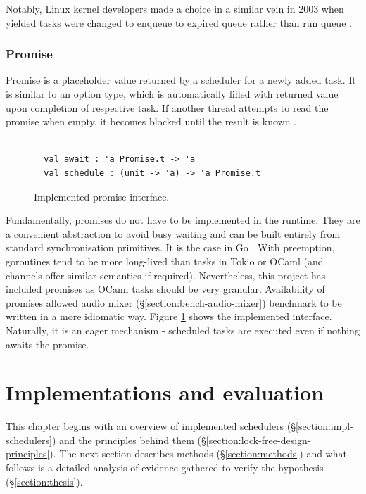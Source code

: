 \documentclass[12pt,a4paper,twoside]{report}
\begin{document}
Notably, Linux kernel developers made a choice in a similar vein in 2003 when yielded tasks were changed to enqueue to expired queue rather than run queue \cite{Theright8:online}. 

\subsection{Promise}
\label{section:promise}
Promise is a placeholder value returned by a scheduler for a newly added task. It is similar to an option type, which is automatically filled with returned value upon completion of respective task. If another thread attempts to read the promise when empty, it becomes blocked until the result is known \cite{Swalens2014}. 

\begin{figure} 
    \centering
    \begin{verbatim}

  val await : 'a Promise.t -> 'a
  val schedule : (unit -> 'a) -> 'a Promise.t
    \end{verbatim}
    \caption{Implemented promise interface.}
    \label{fig:promise-interface}
\end{figure}


Fundamentally, promises do not have to be implemented in the runtime. They are a convenient abstraction to avoid busy waiting and can be built entirely from standard synchronisation primitives. It is the case in Go \cite{chebyras74:online}. With preemption, goroutines tend to be more long-lived than tasks in Tokio or OCaml (and channels offer similar semantics if required). Nevertheless, this project has included promises as OCaml tasks should be very granular. Availability of promises allowed audio mixer (\S\ref{section:bench-audio-mixer}) benchmark to be written in a more idiomatic way. Figure \ref{fig:promise-interface} shows the implemented interface. Naturally, it is an eager mechanism - scheduled tasks are executed even if nothing awaits the promise. 
 

\chapter{Implementations and evaluation}
\label{chapter:evaluation}

This chapter begins with an overview of implemented schedulers (\S\ref{section:impl-schedulers}) and the principles behind them (\S\ref{section:lock-free-design-principles}). The next section describes methods (\S\ref{section:methods}) and what follows is a detailed analysis of evidence gathered to verify the hypothesis (\S\ref{section:thesis}). 
\end{document}

